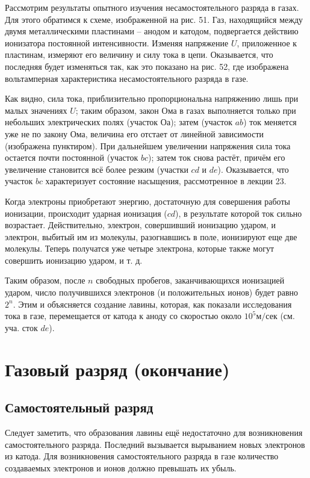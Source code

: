 \documentclass[a4paper,10pt]{book}
\begin{document}
Рассмотрим результаты опытного изучения несамостоятельного разряда в газах. Для этого обратимся к схеме, изображенной на рис. 51. Газ, находящийся между двумя металлическими пластинами -- анодом и катодом, подвергается действию ионизатора постоянной интенсивности. Изменяя напряжение $U$, приложенное к пластинам, измеряют его величину и силу тока в цепи. Оказывается, что последняя будет изменяться так, как это показано на рис. 52, где изображена вольтамперная характеристика несамостоятельного разряда в газе.

Как видно, сила тока, приблизительно пропорциональна напряжению лишь при малых значениях $U$; таким образом, закон Ома в газах выполняется только при небольших электрических полях (участок $Оа$); затем (участок $ab$) ток меняется уже не по закону Ома, величина его отстает от линейной зависимости (изображена пунктиром). При дальнейшем увеличении напряжения сила тока остается почти постоянной (участок $bc$); затем ток снова растёт, причём его увеличение становится всё более резким (участки $cd$ и $de$). Оказывается, что участок $bc$ характеризует состояние насыщения, рассмотренное в лекции 23.

Когда электроны приобретают энергию, достаточную для совершения работы ионизации, происходит ударная ионизация ($cd$), в результате которой ток сильно возрастает. Действительно, электрон, совершивший ионизацию ударом, и электрон, выбитый им из молекулы, разогнавшись в поле, ионизируют еще две молекулы. Теперь получатся уже четыре электрона, которые также могут совершить ионизацию ударом, и т. д.

Таким образом, после $n$ свободных пробегов, заканчивающихся ионизацией ударом, число получившихся электронов (и положительных ионов) будет равно $2^n$. Этим и объясняется создание лавины, которая, как показали исследования тока в газе, перемещается от катода к аноду со скоростью около $10^5 \textit{м/сек}$ (см. уча. сток $de$).

\chapter{Газовый разряд (окончание)}
\section{Самостоятельный разряд}
Следует заметить, что образования лавины ещё недостаточно для возникновения самостоятельного разряда. Последний вызывается вырыванием новых электронов из катода. Для возникновения самостоятельного разряда в газе количество создаваемых электронов и ионов должно превышать их убыль.
\end{document}
